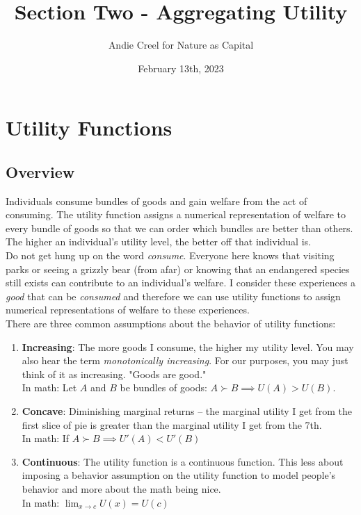 \documentclass{article}
\title{Section Two - Aggregating Utility}
\author{Andie Creel for Nature as Capital}
\date{February 13th, 2023}
\begin{document}
\maketitle

\section{Utility Functions}

\subsection{Overview}

Individuals consume bundles of goods and gain welfare from the act of consuming. The utility function assigns a numerical representation of welfare to every bundle of goods so that we can order which bundles are better than others. The higher an individual's utility level, the better off that individual is. \\

Do not get hung up on the word \textit{consume}. Everyone here knows that visiting parks or seeing a grizzly bear (from afar) or knowing that an endangered species still exists can contribute to an individual's welfare. I consider these experiences a \textit{good} that can be \textit{consumed} and therefore we can use utility functions to assign numerical representations of welfare to these experiences.\\

There are three common assumptions about the behavior of utility functions: 
    \begin{enumerate}
    \item \textbf{Increasing}: The more goods I consume, the higher my utility level. You may also hear the term \textit{monotonically increasing}. For our purposes, you may just think of it as increasing. "Goods are good."\\
    \newline
    In math: Let $A$ and $B$ be bundles of goods: $A \succ B \implies U(A) > U(B)$. 
    \item \textbf{Concave}: Diminishing marginal returns -- the marginal utility I get from the first slice of pie is greater than the marginal utility I get from the 7th.\\
    \newline
    In math: If $A \succ B \implies  U'(A) < U'(B)$
    \item \textbf{Continuous}: The utility function is a continuous function. This less about imposing a behavior assumption on the utility function to model people's behavior and more about the math being nice. \\
    \newline
    In math: $\lim_{x \rightarrow c} U(x) = U(c)$
    
    \end{enumerate}
\end{document}
